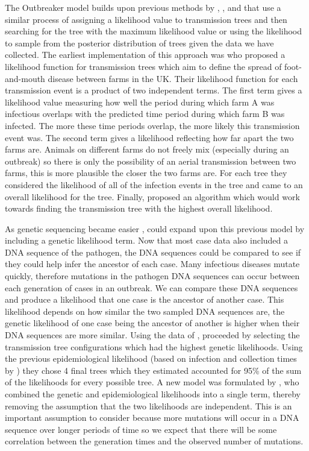 \documentclass[11pt,a4paper]{report}
\begin{document}
The Outbreaker model builds upon previous methods by \citet{Haydon03}, \citet{Cottam08},\citet{Morelli12} and \citet{Ypma13} that use a similar process of assigning a likelihood value to transmission trees and then searching for the tree with the maximum likelihood value or using the likelihood to sample from the posterior distribution of trees given the data we have collected. The earliest implementation of this approach was \citet{Haydon03} who proposed a likelihood function for transmission trees which aim to define the spread of foot-and-mouth disease between farms in the UK. Their likelihood function for each transmission event is a product of two independent terms. The first term gives a likelihood value measuring how well the period during which farm A was infectious overlaps with the predicted time period during which farm B was infected. The more these time periods overlap, the more likely this transmission event was. The second term gives a likelihood reflecting how far apart the two farms are. Animals on different farms do not freely mix (especially during an outbreak) so there is only the possibility of an aerial transmission between two farms, this is more plausible the closer the two farms are. For each tree they considered the likelihood of all of the infection events in the tree and came to an overall likelihood for the tree. Finally, \citet{Haydon03} proposed an algorithm which would work towards finding the transmission tree with the highest overall likelihood.

As genetic sequencing became easier \citep{Koser12}, \citet{Cottam08} could expand upon this previous model by including a genetic likelihood term. Now that most case data also included a DNA sequence of the pathogen, the DNA sequences could be compared to see if they could help infer the  ancestor of each case. Many infectious diseases mutate quickly, therefore mutations in the pathogen DNA sequences can occur between each generation of cases in an outbreak. We can compare these DNA sequences and produce a likelihood that one case is the ancestor of another case. This likelihood depends on how similar the two sampled DNA sequences are, the genetic likelihood of one case being the ancestor of another is higher when their DNA sequences are more similar. Using the data of \citet{Haydon03}, \citet{Cottam08} proceeded by selecting the transmission tree configurations which had the highest genetic likelihoods. Using the previous epidemiological likelihood (based on infection and collection times by \citet{Haydon03}) they chose 4 final trees which they estimated accounted for 95\% of the sum of the likelihoods for every possible tree. A new model was formulated by \citet{Ypma13}, who combined the genetic and epidemiological likelihoods into a single term, thereby removing the assumption that the two likelihoods are independent. This is an important assumption to consider because more mutations will occur in a DNA sequence over longer periods of time so we expect that there will be some correlation between the generation times and the observed number of mutations.
\end{document}
